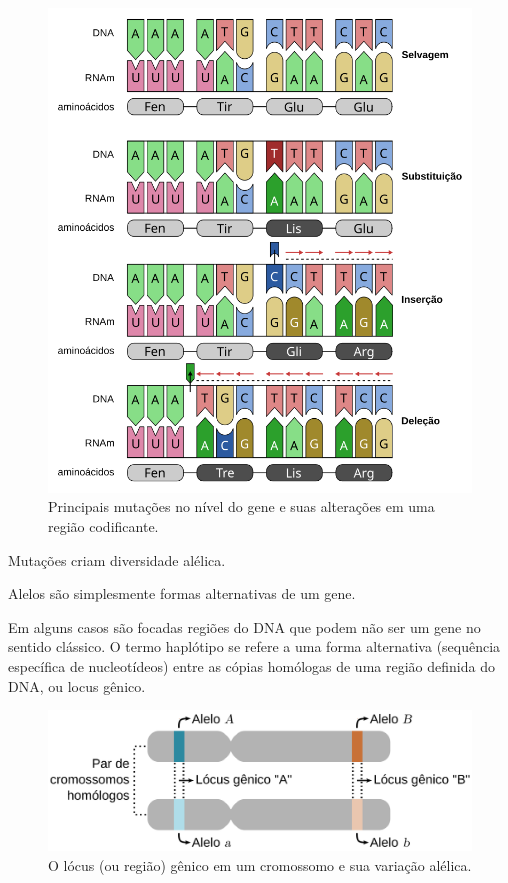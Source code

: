 \documentclass[
]{book}
\begin{document}
\begin{figure}

{\centering \includegraphics[width=600px]{figs/mutation} 

}

\caption{Principais mutações no nível do gene e suas alterações em uma região codificante.}\label{fig:mutacao}
\end{figure}

Mutações criam diversidade alélica.

Alelos são simplesmente formas alternativas de um gene.

Em alguns casos são focadas regiões do DNA que podem não ser um gene no sentido clássico. O termo haplótipo se refere a uma forma alternativa (sequência específica de nucleotídeos) entre as cópias homólogas de uma região definida do DNA, ou locus gênico.

\begin{figure}

{\centering \includegraphics[width=600px]{figs/chromosome_locus_alelle} 

}

\caption{O lócus (ou região) gênico em um cromossomo e sua variação alélica.}\label{fig:cromossomo}
\end{figure}
\end{document}

